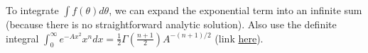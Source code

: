 \documentclass[12pt]{article}
\begin{document}
To integrate $\int f(\theta) d\theta$, we can expand the exponential term into an infinite sum (because there is no straightforward analytic solution). Also use the definite integral $\int_0^{\infty} e^{-Ax^2}x^ndx = \frac{1}{2}\Gamma(\frac{n+1}{2})A^{-(n+1)/2}$ (link \href{https://en.wikipedia.org/wiki/List_of_integrals_of_exponential_functions}{here}).

\begin{comment}
	\begin{align}
	=& \int_{0}^{\infty} \frac{1}{2\pi} e^{-\frac{1}{2}(\rho^2 + \rho^2_{obs,k})}\rho_{obs,k} \Big[\int_{\theta_1}^{\theta_2} \sum_{a=0}^{\infty} \frac{(\rho\rho_{obs,k}\cos\theta)^a}{a!} d\theta \Big]d\rho_{obs,k} \\
	=& \int_{0}^{\infty} \frac{1}{2\pi} e^{-\frac{1}{2}(\rho^2 + \rho^2_{obs,k})}\rho_{obs,k} \Big[\int_{\theta_1}^{\theta_2} 
		(1+\rho\rho_{obs,k}\cos\theta + \frac{1}{2}\rho^2\rho^2_{obs,k}\cos^2\theta + \frac{1}{6}\rho^3\rho^3_{obs,k}\cos^3\theta \\ \notag &+ \frac{1}{24}\rho^4\rho^4_{obs,k}\cos^4\theta + \frac{1}{120}\rho^5\rho^5_{obs,k}\cos^5\theta + \frac{1}{720}\rho^6\rho^6_{obs,k}\cos^6\theta + ...) d\theta \Big] d\rho_{obs,k} \\
	\approx& \int_{0}^{\infty} \frac{1}{2\pi} e^{-\frac{1}{2}(\rho^2 + \rho^2_{obs,k})}\rho_{obs,k} 
		\Big[
		\Delta\theta + \rho\rho_{obs,k}\sin\theta|_{\theta_1}^{\theta_2} + \frac{1}{2}\rho^2\rho^2_{obs,k}\frac{1}{2}(\Delta\theta + \sin\theta\cos\theta|_{\theta_1}^{\theta_2}) \\ \notag &+ \frac{1}{6}\rho^3\rho^3_{obs,k}\frac{1}{12}(9\sin\theta+\sin3\theta)|_{\theta_1}^{\theta_2} + \frac{1}{24}\rho^4\rho^4_{obs,k}\frac{1}{32}(12\Delta\theta+8\sin2\theta+\sin4\theta)|_{\theta_1}^{\theta_2} \\ \notag &+ \frac{1}{120}\rho^5\rho^5_{obs,k}(\frac{5}{8}\sin\theta + \frac{5}{48}\sin3\theta + \frac{1}{80}\sin5\theta)|_{\theta_1}^{\theta_2} \\ \notag &+ \frac{1}{720}\rho^6\rho^6_{obs,k}\frac{1}{192}(60\Delta\theta + 45\sin2\theta + 9\sin4\theta + \sin6\theta)|_{\theta_1}^{\theta_2}
		\Big] d\rho_{obs,k} \\
	=& \frac{1}{2\pi}e^{-\frac{1}{2}\rho^2}
		\Big[
		\Gamma(1)\Delta\theta + \rho(1/2)^{-1/2}\Gamma(3/2)\sin\theta|_{\theta_1}^{\theta_2} + \rho^2(1/2)\Gamma(2)(\Delta\theta + \sin\theta\cos\theta|_{\theta_1}^{\theta_2}) \\ \notag &+ \frac{1}{6}\rho^3(1/2)^{-3/2}\frac{1}{12}\Gamma(5/2)(9\sin\theta+\sin3\theta)|_{\theta_1}^{\theta_2} \\ \notag &+ \rho^4\frac{1}{24}\frac{1}{32}(1/2)^{-2}\Gamma(3)(12\Delta\theta+8\sin2\theta+\sin4\theta)|_{\theta_1}^{\theta_2} \\ \notag &+ \rho^5\frac{1}{120}(1/2)^{-5/2}\Gamma(7/2)(\frac{5}{8}\sin\theta + \frac{5}{48}\sin3\theta + \frac{1}{80}\sin5\theta)|_{\theta_1}^{\theta_2} \\ \notag &+ \rho^6\frac{1}{720}\frac{1}{192}(1/2)^{-3}\Gamma(4)(60\Delta\theta + 45\sin2\theta + 9\sin4\theta + \sin6\theta)|_{\theta_1}^{\theta_2}
		\Big] \\
	\end{align}
	

\end{comment}
\end{document}
